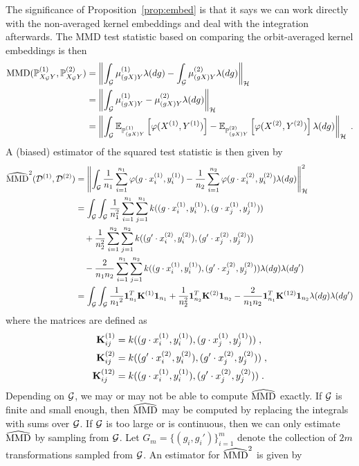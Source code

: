 The significance of Proposition~\ref{prop:embed} is that it says we can work directly with the non-averaged kernel embeddings and deal with the integration afterwards. The MMD test statistic based on comparing the orbit-averaged kernel embeddings is then
\begin{align*}
\mathrm{MMD}(\mathbb{P}_{X_{\mathcal{G}} Y}^{(1)},\mathbb{P}_{X_{\mathcal{G}} Y}^{(2)}) &= \left\|\int_{\mathcal{G}}\mu_{(gX)Y}^{(1)}\lambda(dg) - \int_{\mathcal{G}}\mu_{(gX)Y}^{(2)}\lambda(dg)\right\|_{\mathcal{H}} \\
&= \left\|\int_{\mathcal{G}}\mu_{(gX)Y}^{(1)} - \mu_{(gX)Y}^{(2)}\lambda(dg)\right\|_{\mathcal{H}} \\
&= \left\|\int_{\mathcal{G}}\mathbb{E}_{\mathbb{P}_{(gX)Y}^{(1)}}\left[\varphi(X^{(1)},Y^{(1)})\right] - \mathbb{E}_{\mathbb{P}_{(gX)Y}^{(2)}}\left[\varphi(X^{(2)},Y^{(2)})\right]\lambda(dg)\right\|_{\mathcal{H}} \;.
\end{align*}
A (biased) estimator of the squared test statistic is then given by
\begin{align*}
\widehat{\mathrm{MMD}}^2(\mathcal{D}^{(1)},\mathcal{D}^{(2)}) &= \left\|\int_{\mathcal{G}}\frac{1}{n_1}\sum_{i=1}^{n_1}\varphi(g\cdot x^{(1)}_i,y^{(1)}_i) - \frac{1}{n_2}\sum_{i=1}^{n_2}\varphi(g\cdot x^{(2)}_i,y^{(2)}_i)\lambda(dg)\right\|_{\mathcal{H}}^2 \\
&= \int_{\mathcal{G}}\int_{\mathcal{G}} \frac{1}{n_1^2}\sum_{i=1}^{n_1}\sum_{j=1}^{n_1}k((g\cdot x^{(1)}_i,y^{(1)}_i),(g\cdot x^{(1)}_j,y^{(1)}_j)) \\
&\quad + \frac{1}{n_2^2}\sum_{i=1}^{n_2}\sum_{j=1}^{n_2}k((g'\cdot x^{(2)}_i, y^{(2)}_i),(g'\cdot x^{(2)}_j, y^{(2)}_j)) \\
&\quad - \frac{2}{n_1n_2}\sum_{i=1}^{n_1}\sum_{j=1}^{n_2}k((g\cdot x^{(1)}_i, y^{(1)}_i),(g'\cdot x^{(2)}_j, y^{(2)}_j)) \lambda(dg)\lambda(dg') \\
&= \int_{\mathcal{G}}\int_{\mathcal{G}} \frac{1}{{n_1}^2}\mathbf{1}_{n_1}^T\mathbf{K}^{(1)}\mathbf{1}_{n_1} + \frac{1}{n_2^2}\mathbf{1}_{n_2}^T\mathbf{K}^{(2)}\mathbf{1}_{n_2} - \frac{2}{n_1n_2}\mathbf{1}_{n_1}^T\mathbf{K}^{(12)}\mathbf{1}_{n_2} \lambda(dg)\lambda(dg')
\end{align*}
where the matrices are defined as
\begin{align*}
\mathbf{K}^{(1)}_{ij} &= k((g\cdot x^{(1)}_i,y^{(1)}_i),(g\cdot x^{(1)}_j,y^{(1)}_j)) \;, \\
\mathbf{K}^{(2)}_{ij} &= k((g'\cdot x^{(2)}_i, y^{(2)}_i),(g'\cdot x^{(2)}_j, y^{(2)}_j)) \;, \\
\mathbf{K}^{(12)}_{ij} &= k((g\cdot x^{(1)}_i, y^{(1)}_i),(g'\cdot x^{(2)}_j, y^{(2)}_j)) \;.
\end{align*}
Depending on $\mathcal{G}$, we may or may not be able to compute $\widehat{\mathrm{MMD}}$ exactly. If $\mathcal{G}$ is finite and small enough, then $\widehat{\mathrm{MMD}}$ may be computed by replacing the integrals with sums over $\mathcal{G}$. If $\mathcal{G}$ is too large or is continuous, then we can only estimate $\widehat{\mathrm{MMD}}$ by sampling from $\mathcal{G}$. Let $G_m=\{(g_i,g_i')\}_{i=1}^m$ denote the collection of $2m$ transformations sampled from $\mathcal{G}$. An estimator for $\widehat{\mathrm{MMD}}^2$ is given by
